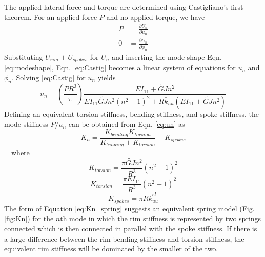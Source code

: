 \documentclass{bmd2016p}
\begin{document}
The applied lateral force and torque are determined using Castigliano's first theorem. For an applied force $P$ and no applied torque, we have
	\begin{equation}\label{eq:Castig}
	\begin{split}
	P &= \frac{\partial U_n}{\partial u_n}\\%
	0 &= \frac{\partial U_n}{\partial \phi_n}%
	\end{split}
	\end{equation}
Substituting $U_{rim} + U_{spokes}$ for $U_n$ and inserting the mode shape Eqn. \ref{eq:modeshape}, Eqn. \ref{eq:Castig} becomes a linear system of equations for $u_n$ and $\phi_n$. Solving \ref{eq:Castig} for $u_n$ yields
	\begin{equation}\label{eq:un}
	u_n = \left(\frac{PR^3}{\pi}\right) \frac{EI_{11}+\widetilde{GJ}n^2}{EI_{11}\widetilde{GJ}n^2(n^2-1)^2 + R\bar{k}_{uu}(EI_{11}+\widetilde{GJ}n^2)}
	\end{equation}
Defining an equivalent torsion stiffness, bending stiffness, and spoke stiffness, the mode stiffness $P/u_n$ can be obtained from Eqn. \ref{eq:un} as
	\begin{equation}\label{eq:Kn_spring}
	K_n = \frac{K_{bending}K_{torsion}}{K_{bending}+K_{torsion}} + K_{spokes}
	\end{equation}
\,\,\,\, where
	\begin{equation}\label{eq:Ktorsion}
	K_{torsion} = \frac{\pi\widetilde{GJ}n^2}{R^3}(n^2-1)^2
	\end{equation}
	\begin{equation}\label{eq:Kbending}
	K_{torsion} = \frac{\pi EI_{11}}{R^3}(n^2-1)^2
	\end{equation}
	\begin{equation}\label{eq:Kspokes}
	K_{spokes} = \pi R \bar{k}_{uu}^{el}
	\end{equation}
The form of Equation \ref{eq:Kn_spring} suggests an equivalent spring model (Fig. \ref{fig:Kn}) for the $n$th mode in which the rim stiffness is represented by two springs connected which is then connected in parallel with the spoke stiffness. If there is a large difference between the rim bending stiffness and torsion stiffness, the equivalent rim stiffness will be dominated by the smaller of the two.
\end{document}

